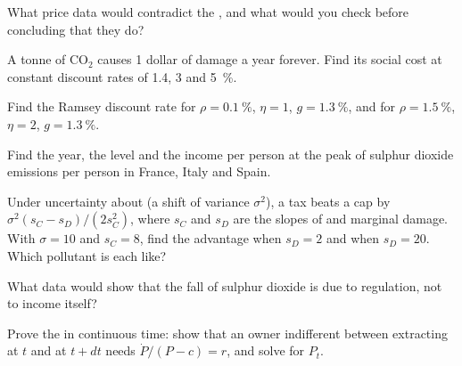\begin{exercise}[$\star$]\label{exo:b3:environmental-and-resource-economics:4}
What price data would contradict the , and what would you check
before concluding that they do?
\end{exercise}

\begin{exercise}[$\star\star$]\label{exo:b3:environmental-and-resource-economics:5}
A tonne of CO$_2$ causes 1 dollar of damage a year forever. Find its social cost at constant
discount rates of 1.4, 3 and 5~\%.
\end{exercise}

\begin{exercise}[$\star\star$]\label{exo:b3:environmental-and-resource-economics:6}
Find the Ramsey discount rate for $\rho = 0.1~\%$, $\eta = 1$, $g = 1.3~\%$, and for $\rho = 1.5~\%$, $\eta = 2$, $g = 1.3~\%$.
\end{exercise}

\begin{exercise}[$\star\star$]\label{exo:b3:environmental-and-resource-economics:7}
Find the year, the level and the income per person at the peak of sulphur dioxide
emissions per person in France, Italy and Spain.
\end{exercise}

\begin{exercise}[$\star\star$]\label{exo:b3:environmental-and-resource-economics:8}
Under uncertainty about  (a shift of variance $\sigma^2$), a tax beats a cap by
$\sigma^2(s_C - s_D)/(2s_C^2)$, where $s_C$ and $s_D$ are the slopes of  and marginal damage. With $\sigma = 10$
and $s_C = 8$, find the advantage when $s_D = 2$ and when $s_D = 20$. Which pollutant is each like?
\end{exercise}

\begin{exercise}[$\star\star$]\label{exo:b3:environmental-and-resource-economics:9}
What data would show that the fall of sulphur dioxide is due to regulation, not to
income itself?
\end{exercise}

\begin{exercise}[$\star\star\star$]\label{exo:b3:environmental-and-resource-economics:10}
Prove the  in continuous time: show that an owner indifferent between
extracting at $t$ and at $t + dt$ needs $\dot P/(P - c) = r$, and solve for $P_t$.
\end{exercise}

